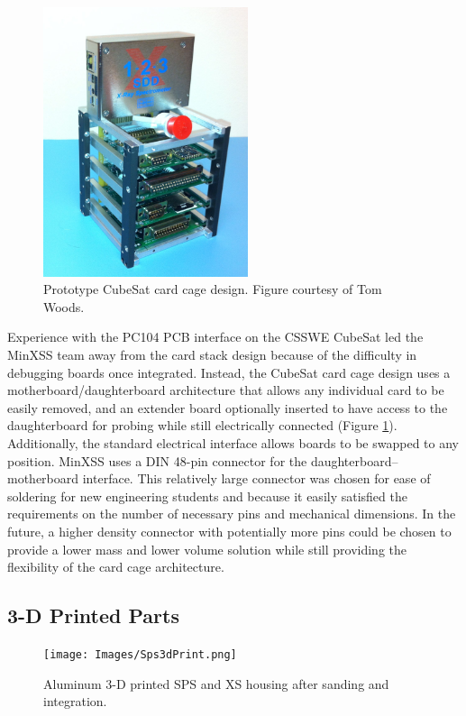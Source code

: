 \begin{figure}[!h]
    \begin{center}
	    \includegraphics[width=60mm]{Images/CardCage.png}
    \end{center}
    \caption[CubeSat card cage]{
        Prototype CubeSat card cage design. Figure courtesy of Tom Woods. 
    }
    \label{fig:cardcage}
\end{figure}

Experience with the PC104 PCB interface on the CSSWE CubeSat led the MinXSS team away from the card stack design because of the difficulty in debugging boards once integrated. Instead, the CubeSat card cage design uses a motherboard/daughterboard architecture that allows any individual card to be easily removed, and an extender board optionally inserted to have access to the daughterboard for probing while still electrically connected (Figure \ref{fig:cardcage}). Additionally, the standard electrical interface allows boards to be swapped to any position. MinXSS uses a DIN 48-pin connector for the daughterboard–motherboard interface. This relatively large connector was chosen for ease of soldering for new engineering students and because it easily satisfied the requirements on the number of necessary pins and mechanical dimensions. In the future, a higher density connector with potentially more pins could be chosen to provide a lower mass and lower volume solution while still providing the flexibility of the card cage architecture.

\subsection{3-D Printed Parts}

\begin{figure}[!h]
    \begin{center}
	    \texttt{[image: Images/Sps3dPrint.png]}
    \end{center}
    \caption[Aluminum 3-D printed SPS and XS]{
        Aluminum 3-D printed SPS and XS housing after sanding and integration.  
    }
    \label{fig:sps3dprint}
\end{figure}

